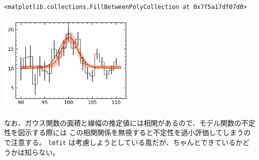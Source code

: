 \documentclass[a4paper, 9pt, notitlepage, uplatex, dvipdfmx]{jsarticle}
\begin{document}
\label{}
\begin{verbatim}
<matplotlib.collections.FillBetweenPolyCollection at 0x7f5a17df07d0>
\end{verbatim}

\begin{center}
\includegraphics[width=0.5\textwidth]{./obipy-resources/gauss.png}
\end{center}

なお、ガウス関数の面積と線幅の推定値には相関があるので、モデル関数の不定性を図示する際には
この相関関係を無視すると不定性を過小評価してしまうので注意する。
\texttt{lmfit} は考慮しようとしている風だが、ちゃんとできているかどうかは知らない。
\end{document}

